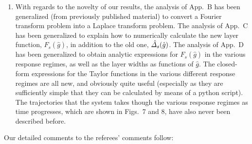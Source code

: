 \documentclass{article}[12pt]
\begin{document}
\begin{enumerate}
\item With regards to the novelty of our results, the analysis of App.~B has been generalized (from previously published material) to convert a Fourier transform problem into a Laplace
transform problem. The analysis of App.~C has been generalized to explain how to numerically calculate the new layer function, $F_s(\hat{g})$, in addition to
the old one, $\hat{\mit\Delta}_s(\hat{g})$.  The analysis of App.~D has been generalized to obtain analytic expressions for $F_s(\hat{g})$ in the various response regimes, as well as the layer widths as functions of $\hat{g}$.
The closed-form expressions for the Taylor functions in the various different response regimes are all new, and obviously quite useful (especially as they are sufficiently
simple that they can be calculated by means of a python script). The trajectories
that the system takes though the various response regimes as time progresses, which are shown in Figs.~7 and 8, have also never been described before. 

\end{enumerate}

Our detailed comments to the referees' comments follow:
\end{document}
